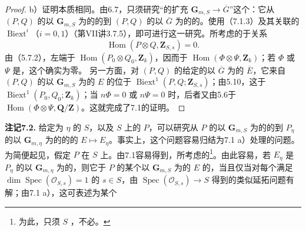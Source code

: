 \begin{proof}
 b）证明本质相同。由6.7，只须研究“的扩充 $\mathbf G_{m,S}\to\overline G$”这个：它从 $(P,Q)$ 的以 $\mathbf G_{m,S}$ 为的的到 $(P,Q)$ 的以 $\overline G$ 为的的。使用（7.1.3）及其关联的 $\operatorname{Biext}^i$（$i=0,1$）（第VII讲3.7.5），即可进行这一研究。所考虑的于关系
\[
\operatorname{Hom}(P\otimes Q,\mathbf Z_{S,s})=0.\tag{7.1.7}
\]
由（5.7.2），左端于 $\operatorname{Hom}(P_0\otimes Q_0,\mathbf Z_k)$，因而于 $\operatorname{Hom}(\Phi\otimes\Psi,\mathbf Z_k)$；若 $\Phi$ 或 $\Psi$ 是，这个确实为零。
另一方面，对 $(P,Q)$ 的给定的以 $\overline G$ 为的 $\overline E$，它来自 $(P,Q)$ 的以 $\mathbf G_{m,S}$ 为的 $E$ 的位于 $\operatorname{Biext}^1(P,Q;\mathbf Z_{S,s})$；由5.10，这于 $\operatorname{Biext}^1(P_0,Q_0;\mathbf Z_k)$；当 $n\Phi=0$ 或 $n\Psi=0$ 时，后者又由5.6于 $\operatorname{Hom}(\Phi\otimes\Psi,\mathbf Q/\mathbf Z)$。这就完成了7.1的证明。
\end{proof}
\textbf{注记7.2.} 给定为 $\eta$ 的 $S$，以及 $S$ 上的 $P$，可以研究从 $P$ 的以 $\mathbf G_{m,S}$ 为的的到 $P_\eta$ 的以 $\mathbf G_{m,\eta}$ 为的的的 $E\mapsto E_\eta$。事实上，这个问题容易归结为7.1 a）处理的问题。为简便起见，假定 $P$ 在 $S$ 上。由7.1容易得到，所考虑的\footnote{为此，只须 $S$ ，不必。}。由此容易，若 $E_\eta$ 是 $P_\eta$ 的以 $\mathbf G_{m,\eta}$ 为的，则它于 $P$ 的某个以 $\mathbf G_{m,S}$ 为的 $E$ 的，当且仅当对每个满足 $\dim\operatorname{Spec}(\mathcal O_{S,s})=1$ 的 $s\in S$，由 $\operatorname{Spec}(\mathcal O_{S,s})\to S$ 得到的类似延拓问题有解；由7.1 a），这可表述为某个
